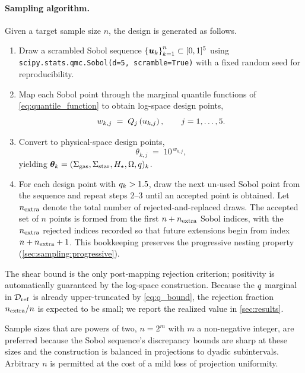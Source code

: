 \paragraph{Sampling algorithm.}
Given a target sample size $n$, the design is generated as follows.
\begin{enumerate}
\item Draw a scrambled Sobol sequence
$\left\{{\bm{u}_k}\right\}_{k=1}^{n} \subset [0,1]^{5}$ using
\texttt{scipy.stats.qmc.Sobol(d=5, scramble=True)} with a fixed random
seed for reproducibility.
\item Map each Sobol point through the marginal quantile functions of
\autoref{eq:quantile_function} to obtain log-space design points,
\begin{equation}
w_{k,j} \;=\; Q_j\left({u_{k,j}}\right),
\qquad j = 1,\ldots,5.
\label{eq:sobol_map}
\end{equation}
\item Convert to physical-space design points,
\begin{equation}
\theta_{k,j} \;=\; 10^{\,w_{k,j}},
\label{eq:to_physical}
\end{equation}
yielding $\bm{\theta}_k = (\Sigma_{\rm gas}, \Sigma_{\rm star}, H_\star, \Omega, q)_k$.
\item For each design point with $q_k > 1.5$, draw the next
un-used Sobol point from the sequence and repeat steps 2--3 until an
accepted point is obtained. Let $n_{\rm extra}$ denote the total
number of rejected-and-replaced draws. The accepted set of $n$ points
is formed from the first $n + n_{\rm extra}$ Sobol indices, with the
$n_{\rm extra}$ rejected indices recorded so that future extensions
begin from index $n + n_{\rm extra} + 1$. This bookkeeping preserves
the progressive nesting property (\autoref{sec:sampling:progressive}).
\end{enumerate}
The shear bound is the only post-mapping rejection criterion; positivity
is automatically guaranteed by the log-space construction. Because the
$q$ marginal in $\mathcal{D}_{\rm ref}$ is already upper-truncated by
\autoref{eq:q_bound}, the rejection fraction $n_{\rm extra}/n$ is
expected to be small; we report the realized value in
\autoref{sec:results}.

Sample sizes that are powers of two, $n = 2^{m}$ with $m$ a non-negative
integer, are preferred because the Sobol sequence's discrepancy bounds
are sharp at these sizes and the construction is balanced in projections
to dyadic subintervals. Arbitrary $n$ is permitted at the cost of a mild
loss of projection uniformity.

